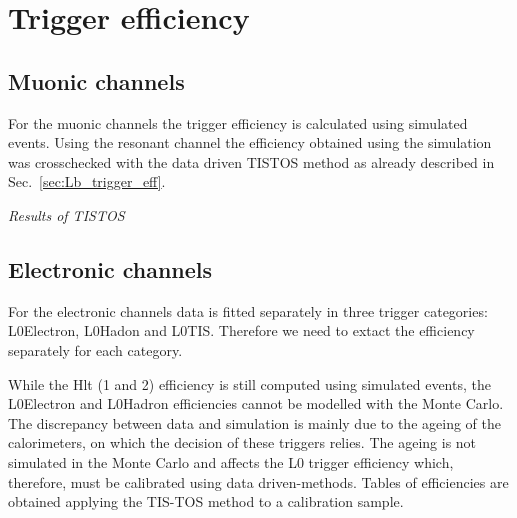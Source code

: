 \section{Trigger efficiency}
\label{sec:RKst_trigger_eff}

\subsection{Muonic channels}

For the muonic channels the trigger efficiency is calculated using simulated events.
Using the resonant channel the efficiency obtained using the simulation
was crosschecked with the data driven TISTOS method as already described in Sec.~\ref{sec:Lb_trigger_eff}.


{\em Results of TISTOS}


\subsection{Electronic channels}

For the electronic channels data is fitted separately in three trigger categories: L0Electron, L0Hadon and L0TIS.
Therefore we need to extact the efficiency separately for each category.

While the Hlt (1 and 2) efficiency is still computed using simulated events,
the L0Electron and L0Hadron efficiencies cannot be modelled with the Monte Carlo.
The discrepancy between data and simulation is mainly due to the ageing of the 
calorimeters, on which the decision of these triggers relies. The ageing is not simulated
in the Monte Carlo and affects the L0 trigger efficiency which, therefore, must
be calibrated using data driven-methods. Tables of efficiencies are obtained
applying the TIS-TOS method to a calibration sample.

